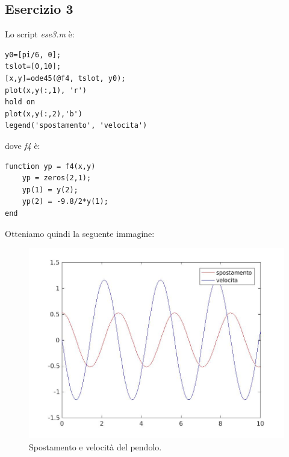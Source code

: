 \documentclass[11pt,a4paper,twoside,openright,titlepage,
headinclude,footinclude,BCOR5mm,
numbers=noenddot,cleardoublepage=empty,
tablecaptionabove]{scrbook}
\begin{document}
\subsection{Esercizio 3}
Lo script \emph{ese3.m} è:
\begin{lstlisting}[frame=trBL]
y0=[pi/6, 0];
tslot=[0,10];
[x,y]=ode45(@f4, tslot, y0);
plot(x,y(:,1), 'r')
hold on
plot(x,y(:,2),'b')
legend('spostamento', 'velocita')
\end{lstlisting}
dove \emph{f4} è:
\begin{lstlisting}[frame=trbl]
function yp = f4(x,y)
    yp = zeros(2,1);
    yp(1) = y(2);
    yp(2) = -9.8/2*y(1);
end
\end{lstlisting}
Otteniamo quindi la seguente immagine:
\begin{center}
\begin{figure}[h!]
\includegraphics[width=\textwidth]{figs/ese3.jpg}
\caption{Spostamento e velocità del pendolo.}
\end{figure}
\end{center}

\newpage
\end{document}
